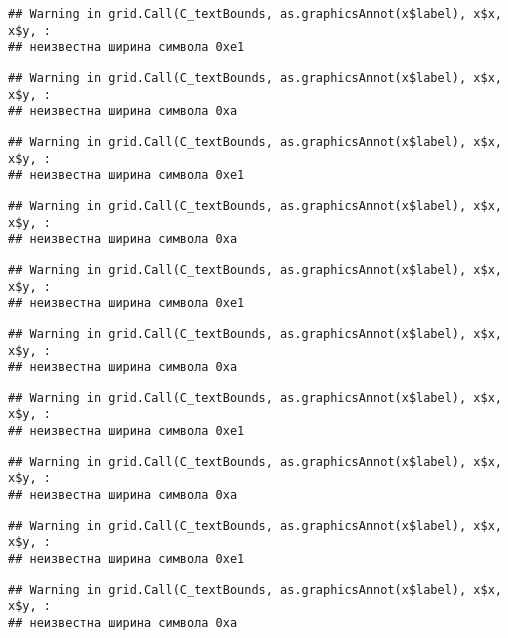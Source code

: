 \documentclass[
]{article}
\begin{document}
\begin{verbatim}
## Warning in grid.Call(C_textBounds, as.graphicsAnnot(x$label), x$x, x$y, :
## неизвестна ширина символа 0xe1
\end{verbatim}

\begin{verbatim}
## Warning in grid.Call(C_textBounds, as.graphicsAnnot(x$label), x$x, x$y, :
## неизвестна ширина символа 0xa
\end{verbatim}

\begin{verbatim}
## Warning in grid.Call(C_textBounds, as.graphicsAnnot(x$label), x$x, x$y, :
## неизвестна ширина символа 0xe1
\end{verbatim}

\begin{verbatim}
## Warning in grid.Call(C_textBounds, as.graphicsAnnot(x$label), x$x, x$y, :
## неизвестна ширина символа 0xa
\end{verbatim}

\begin{verbatim}
## Warning in grid.Call(C_textBounds, as.graphicsAnnot(x$label), x$x, x$y, :
## неизвестна ширина символа 0xe1
\end{verbatim}

\begin{verbatim}
## Warning in grid.Call(C_textBounds, as.graphicsAnnot(x$label), x$x, x$y, :
## неизвестна ширина символа 0xa
\end{verbatim}

\begin{verbatim}
## Warning in grid.Call(C_textBounds, as.graphicsAnnot(x$label), x$x, x$y, :
## неизвестна ширина символа 0xe1
\end{verbatim}

\begin{verbatim}
## Warning in grid.Call(C_textBounds, as.graphicsAnnot(x$label), x$x, x$y, :
## неизвестна ширина символа 0xa
\end{verbatim}

\begin{verbatim}
## Warning in grid.Call(C_textBounds, as.graphicsAnnot(x$label), x$x, x$y, :
## неизвестна ширина символа 0xe1
\end{verbatim}

\begin{verbatim}
## Warning in grid.Call(C_textBounds, as.graphicsAnnot(x$label), x$x, x$y, :
## неизвестна ширина символа 0xa
\end{verbatim}
\end{document}
